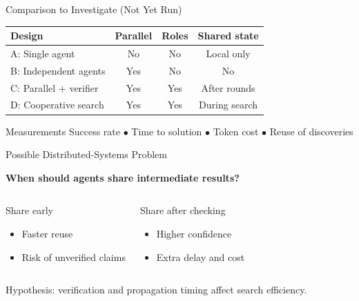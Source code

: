 \documentclass[aspectratio=169,10pt]{beamer}
\begin{document}
\begin{frame}{Comparison to Investigate (Not Yet Run)}
\small
\begin{tabular}{p{4.9cm}ccc}
\toprule
\textbf{Design} & \textbf{Parallel} & \textbf{Roles} & \textbf{Shared state}\\
\midrule
A: Single agent & No & No & Local only\\
B: Independent agents & Yes & No & No\\
C: Parallel + verifier & Yes & Yes & After rounds\\
D: Cooperative search & Yes & Yes & During search\\
\bottomrule
\end{tabular}
\vspace{5mm}
\begin{block}{Measurements}
Success rate $\bullet$ Time to solution $\bullet$ Token cost $\bullet$ Reuse of discoveries
\end{block}
\end{frame}

\begin{frame}{Possible Distributed-Systems Problem}
\begin{center}
\Large\bfseries When should agents share intermediate results?
\end{center}
\vspace{5mm}
\begin{columns}[T,onlytextwidth]
\begin{block}{Share early}
\begin{itemize}
\item Faster reuse
\item Risk of unverified claims
\end{itemize}
\end{block}
\begin{block}{Share after checking}
\begin{itemize}
\item Higher confidence
\item Extra delay and cost
\end{itemize}
\end{block}
\end{columns}
\vspace{4mm}
\centering\small Hypothesis: verification and propagation timing affect search efficiency.
\end{frame}
\end{document}
